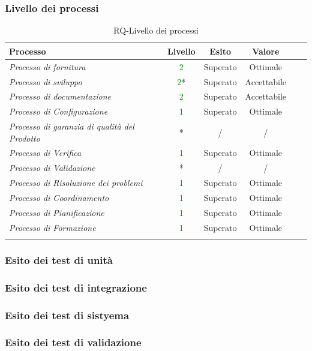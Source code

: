 \subsubsection{Livello dei processi}
\begin{longtable}{|>{\centering}m{6cm}|c|c|c|c|c|}
\hline
\textbf{Processo} & \textbf{Livello} & \textbf{Esito} & \textbf{Valore}\\
\hline
\endhead
\emph{Processo di fornitura} & \textcolor{Green}{2} & Superato & Ottimale\\ \hline
\emph{Processo di sviluppo} & \textcolor{Green}{2}* & Superato & Accettabile\\ \hline
\emph{Processo di documentazione} & \textcolor{Green}{2} & Superato & Accettabile\\ 
\hline
\emph{Processo di Configurazione} & \textcolor{Green}{1} & Superato & Ottimale\\ 
\hline
\emph{Processo di garanzia di qualità del Prodotto} & * & / & /\\ 
\hline
\emph{Processo di Verifica} & \textcolor{Green}{1} & Superato & Ottimale\\ 
\hline
\emph{Processo di Validazione} & * & / & /\\ 
\hline
\emph{Processo di Risoluzione dei problemi} & \textcolor{Green}{1} & Superato & Ottimale\\ 
\hline
\emph{Processo di Coordinamento} & \textcolor{Green}{1} & Superato & Ottimale\\ 
\hline
\emph{Processo di Pianificazione} & \textcolor{Green}{1} & Superato & Ottimale\\ 
\hline
\emph{Processo di Formazione} & \textcolor{Green}{1} & Superato & Ottimale\\ 
\hline
\caption{RQ-Livello dei processi}
\end{longtable}
\newpage

\subsubsection{Esito dei test di unità}

\newpage

\subsubsection{Esito dei test di integrazione}

\newpage

\subsubsection{Esito dei test di sistyema}

\newpage

\subsubsection{Esito dei test di validazione}

\newpage
